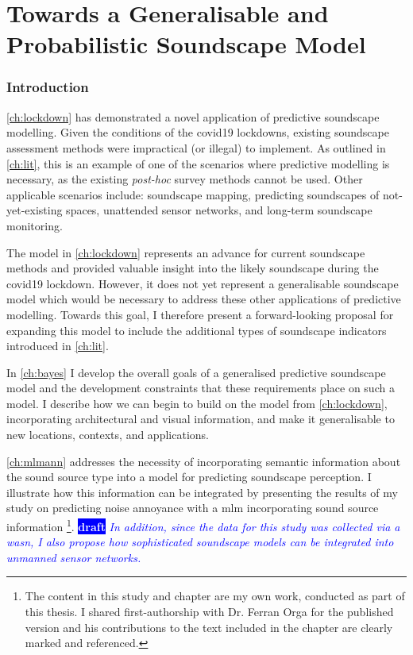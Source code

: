 \documentclass[twoside,fontsize=12pt,titlepage,chapterprefix=true
]{scrbook}
\newcommand{\remark}[3]{%
    {\colorbox{#2}{\sffamily\scriptsize\bfseries\textcolor{white}{#1}}}
    {\sffamily\small\itshape\textcolor{#2}{#3}}
}
\newcommand{\draft}[1]{\remark{draft}{blue}{#1}}
\begin{document}



\part{Towards a Generalisable and Probabilistic Soundscape Model}
\label{part:generalModel}
\section*{Introduction}
\cref{ch:lockdown} has demonstrated a novel application of predictive soundscape modelling. Given the conditions of the \gls{covid19} lockdowns, existing soundscape assessment methods were impractical (or illegal) to implement. As outlined in \cref{ch:lit}, this is an example of one of the scenarios where predictive modelling is necessary, as the existing \emph{post-hoc} survey methods cannot be used. Other applicable scenarios include: soundscape mapping, predicting soundscapes of not-yet-existing spaces, unattended sensor networks, and long-term soundscape monitoring.

The model in \cref{ch:lockdown} represents an advance for current soundscape methods and provided valuable insight into the likely soundscape during the \gls{covid19} lockdown. However, it does not yet represent a generalisable soundscape model which would be necessary to address these other applications of predictive modelling. Towards this goal, I therefore present a forward-looking proposal for expanding this model to include the additional types of soundscape indicators introduced in \cref{ch:lit}.

In \cref{ch:bayes} I develop the overall goals of a generalised predictive soundscape model and the development constraints that these requirements place on such a model. I describe how we can begin to build on the model from \cref{ch:lockdown}, incorporating architectural and visual information, and make it generalisable to new locations, contexts, and applications.

\cref{ch:mlmann} addresses the necessity of incorporating semantic information about the sound source type into a model for predicting soundscape perception. I illustrate how this information can be integrated by presenting the results of my study on predicting noise annoyance with a \gls{mlm} incorporating sound source information \citep{Orga2021Multilevel}\footnote{The content in this study and chapter are my own work, conducted as part of this thesis. I shared first-authorship with Dr. Ferran Orga for the published version and his contributions to the text included in the chapter are clearly marked and referenced. }. \draft{In addition, since the data for this study was collected via a \gls{wasn}, I also propose how sophisticated soundscape models can be integrated into unmanned sensor networks.}
\end{document}
